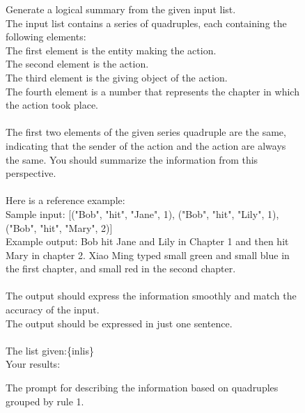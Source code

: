 \begin{figure}[htbp]
\centering
\begin{tcolorbox}
Generate a logical summary from the given input list. \\
The input list contains a series of quadruples, each containing the following elements:\\
The first element is the entity making the action.\\
The second element is the action.\\
The third element is the giving object of the action.\\
The fourth element is a number that represents the chapter in which the action took place.\\
\\
The first two elements of the given series quadruple are the same, indicating that the sender of the action and the action are always the same. You should summarize the information from this perspective.\\
\\
Here is a reference example:\\
Sample input: [("Bob", "hit", "Jane", 1), ("Bob", "hit", "Lily", 1), ("Bob", "hit", "Mary", 2)]\\
Example output: Bob hit Jane and Lily in Chapter 1 and then hit Mary in chapter 2.
Xiao Ming typed small green and small blue in the first chapter, and small red in the second chapter.\\
\\
The output should express the information smoothly and match the accuracy of the input.\\
The output should be expressed in just one sentence.\\
\\
The list given:\{inlis\}\\
Your results:\\
\end{tcolorbox}
\caption{The prompt for describing the information based on quadruples grouped by rule 1.}
\label{tab:group trans1}
\end{figure}



